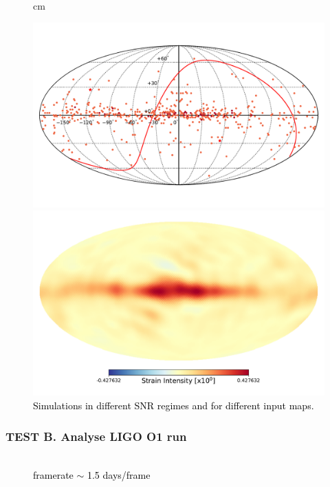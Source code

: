 \documentclass[handout]{beamer}
\begin{document}
{\begin{frame}
\begin{figure}
 cm
\begin{minipage}{0.49\textwidth}
\centering
\includegraphics[width=0.9\columnwidth]{map_poi}
\end{minipage}\hfill
\begin{minipage}{0.49\textwidth}
\centering
\includegraphics[width=0.9\columnwidth]{planck_poi_high}
\end{minipage}
\caption*{\textcolor{black}{Simulations in different SNR regimes and for different input maps.}}
\label{fig:stdev_sim}
\end{figure}

 \end{frame}


 \begin{frame}

 \frametitle{\textcolor{textcoldark}{TEST B. Analyse LIGO O1 run}}
 	\begin{figure}
 		\medskip\\
 	\scriptsize
 	\textcolor{black}{framerate $\sim$ 1.5 days/frame}
 	\end{figure}


\end{frame}}
\end{document}
